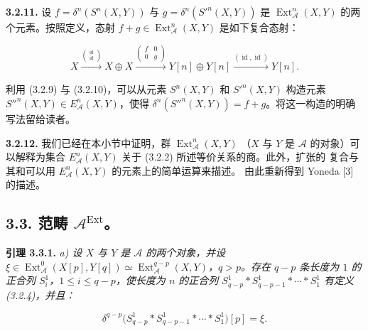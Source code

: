 \clearpage
{}%
\begingroup\small\setlength{\parskip}{0pt}\setlength{\emergencystretch}{1.5em}
\setlength{\abovedisplayskip}{4pt plus 2pt minus 2pt}%
\setlength{\belowdisplayskip}{4pt plus 2pt minus 2pt}%

\medskip\noindent\textbf{3.2.11.}\quad
设 $f=\delta^n(S^n(X,Y))$ 与 $g=\delta^n({S'}^n(X,Y))$ 是
$\operatorname{Ext}_{\mathcal A}^{n}(X,Y)$ 的两个元素。按照定义，态射
$f+g\in\operatorname{Ext}_{\mathcal A}^{n}(X,Y)$ 是如下复合态射：

\[
X\xrightarrow{\binom{\operatorname{id}}{\operatorname{id}}}X\oplus X
\xrightarrow{\begin{pmatrix}f&0\\0&g\end{pmatrix}}
Y[n]\oplus Y[n]
\xrightarrow{(\operatorname{id},\operatorname{id})}Y[n].
\]

利用 (3.2.9) 与 (3.2.10)，可以从元素 $S^n(X,Y)$ 和 ${S'}^n(X,Y)$
构造元素 ${S''}^n(X,Y)\in E_{\mathcal A}^{n}(X,Y)$，使得
$\delta^n({S''}^n(X,Y))=f+g$。将这一构造的明确写法留给读者。

\medskip\noindent\textbf{3.2.12.}\quad
我们已经在本小节中证明，群 $\operatorname{Ext}_{\mathcal A}^{n}(X,Y)$
（$X$ 与 $Y$ 是 $\mathcal A$ 的对象）可以解释为集合
$E_{\mathcal A}^{n}(X,Y)$ 关于 (3.2.2) 所述等价关系的商。此外，扩张的
复合与其和可以用 $E_{\mathcal A}^{n}(X,Y)$ 的元素上的简单运算来描述。
由此重新得到 Yoneda [3] 的描述。

\subsection*{3.3. 范畴
\texorpdfstring{$\mathcal A^{\operatorname{Ext}}$}{A Ext}。}

\medskip\noindent\textbf{引理 3.3.1.}\quad
\textit{a) 设 $X$ 与 $Y$ 是 $\mathcal A$ 的两个对象，并设
$\xi\in\operatorname{Ext}_{\mathcal A}^{0}(X[p],Y[q])\simeq
\operatorname{Ext}_{\mathcal A}^{q-p}(X,Y)$，$q>p$。存在 $q-p$ 条长度为
$1$ 的正合列 $S_i^1$，$1\leq i\leq q-p$，使长度为 $n$ 的正合列
$S_{q-p}^1*S_{q-p-1}^1*\cdots*S_1^1$ 有定义 (3.2.4)，并且：}

\begin{equation}
\delta^{q-p}\bigl(S_{q-p}^1*S_{q-p-1}^1*\cdots*S_1^1\bigr)[p]=\xi.
\tag{3.3.1.1}
\end{equation}

